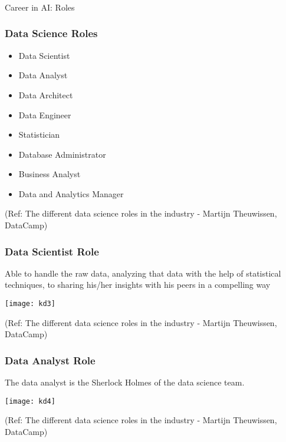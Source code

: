 \begin{frame}[fragile]\frametitle{}
\begin{center}
{\Large Career in AI: Roles}
\end{center}
\end{frame}


\begin{frame}[fragile]\frametitle{Data Science Roles}
\begin{itemize}
\item Data Scientist
\item Data Analyst
\item Data Architect
\item Data Engineer
\item Statistician
\item Database Administrator
\item Business Analyst
\item Data and Analytics Manager
\end{itemize}

{\tiny (Ref: The different data science roles in the industry - Martijn Theuwissen, DataCamp)}
\end{frame}

\begin{frame}[fragile]\frametitle{Data Scientist Role}
Able to handle the raw data, analyzing that data with the help of statistical techniques, to sharing his/her insights with his peers in a compelling way
\begin{center}
\texttt{[image: kd3]}
\end{center}

{\tiny (Ref: The different data science roles in the industry - Martijn Theuwissen, DataCamp)}
\end{frame}

\begin{frame}[fragile]\frametitle{Data Analyst Role}
The data analyst is the Sherlock Holmes of the data science team. 

\begin{center}
\texttt{[image: kd4]}
\end{center}

{\tiny (Ref: The different data science roles in the industry - Martijn Theuwissen, DataCamp)}
\end{frame}

